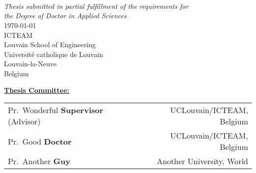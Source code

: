 \thispagestyle{empty}

\begin{center}
\vspace{0.5cm}
{\bf \huge \textsc \thesisTitle}\\
~\\
\vspace{0.5cm}
\large \thesisAuthor\\
\vspace{1cm}
{\em Thesis submitted in partial fulfillment of the requirements for\\
the Degree of Doctor in Applied Sciences}\\
\vspace{1cm}
\monthyeardate\today\\
\vspace{1cm}
ICTEAM\\
Louvain School of Engineering\\
Universit\'{e} catholique de Louvain\\
Louvain-la-Neuve\\
Belgium\\
\end{center}

\vspace{6.5cm}

\noindent\underline{\bf Thesis Committee:}\\
\begin{tabular}{lr}
Pr.~Wonderful {\bf Supervisor} (Advisor) & UCLouvain/ICTEAM, Belgium\\
Pr.~Good {\bf Doctor} & UCLouvain/ICTEAM, Belgium\\
Pr.~Another {\bf Guy} & Another University, World\\
\end{tabular}
